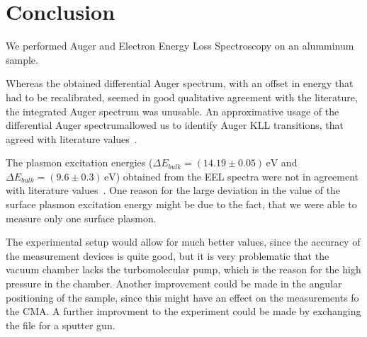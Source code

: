 \documentclass[a4paper,10pt]{scrartcl}
\begin{document}
\section{Conclusion}

We performed Auger and Electron Energy Loss Spectroscopy on an alumminum sample. 

Whereas the obtained differential Auger spectrum, with an offset in energy that had to be recalibrated, seemed in good qualitative agreement with the literature, the integrated Auger spectrum was unusable. An approximative usage of the differential Auger spectrumallowed us to identify Auger KLL transitions, that agreed with literature values~\cite{augerpaper}.

The plasmon excitation energies ($\Delta E_{bulk} = (14.19 \pm 0.05)\,\mbox{eV}$ and $\Delta E_{bulk} = (9.6 \pm 0.3)\,\mbox{eV}$) obtained from the EEL spectra were not in agreement with literature values~\cite{plasmonpaper}. One reason for the large deviation in the value of the surface plasmon excitation energy might be due to the fact, that we were able to measure only one surface plasmon.

The experimental setup would allow for much better values, since the accuracy of the measurement devices is quite good, but it is very problematic that the vacuum chamber lacks the turbomolecular pump, which is the reason for the high pressure in the chamber. Another improvement could be made in the angular positioning of the sample, since this might have an effect on the measurements fo the CMA. A further improvment to the experiment could be made by exchanging the file for a sputter gun.



\nocite{skript}
\nocite{augerpaper}
\nocite{plasmonpaper}
\nocite{handbook}
\nocite{ben}
\nocite{christian}



\end{document}
